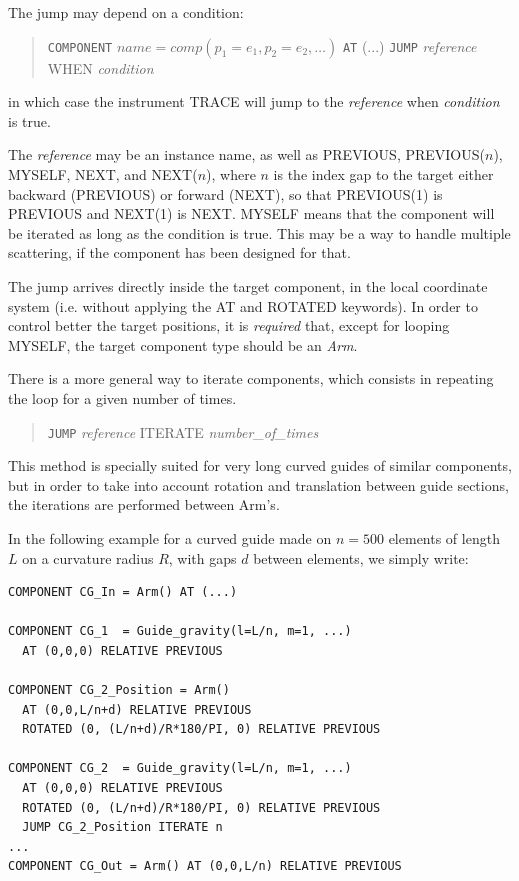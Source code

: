The jump may depend on a condition:
\begin{quote}
  \texttt{COMPONENT} $\textit{name} = \textit{comp}(p_1 = e_1, p_2 = e_2, \ldots)$
  \texttt{AT} (...)
  \texttt{JUMP} {\it reference} WHEN {\it condition}
\end{quote}
in which case the instrument TRACE will jump to the {\it reference} when {\it condition} is true.

The {\it reference} may be an instance name, as well as PREVIOUS, PREVIOUS($n$), MYSELF, NEXT, and NEXT($n$), where $n$ is the index gap to the target either backward (PREVIOUS) or forward (NEXT), so that PREVIOUS(1) is PREVIOUS and NEXT(1) is NEXT. MYSELF means that the component will be iterated as long as the condition is true. This may be a way to handle multiple scattering, if the component has been designed for that.

The jump arrives directly inside the target component, in the local coordinate system (i.e. without applying the AT and ROTATED keywords). In order to control better the target positions, it is \emph{required} that, except for looping MYSELF, the target component type should be an \emph{Arm}.

There is a more general way to iterate components, which consists in repeating the loop for a given number of times.
\begin{quote}
  \texttt{JUMP} {\it reference} ITERATE {\it number\_of\_times}
\end{quote}
This method is specially suited for very long curved guides of similar components, but in order to take into account rotation and translation between guide sections, the iterations are performed between Arm's.

In the following example for a curved guide made on $n=500$ elements of length $L$ on a curvature radius $R$, with gaps $d$ between elements, we simply write:
\begin{verbatim}
COMPONENT CG_In = Arm() AT (...)

COMPONENT CG_1  = Guide_gravity(l=L/n, m=1, ...)
  AT (0,0,0) RELATIVE PREVIOUS

COMPONENT CG_2_Position = Arm()
  AT (0,0,L/n+d) RELATIVE PREVIOUS
  ROTATED (0, (L/n+d)/R*180/PI, 0) RELATIVE PREVIOUS

COMPONENT CG_2  = Guide_gravity(l=L/n, m=1, ...)
  AT (0,0,0) RELATIVE PREVIOUS
  ROTATED (0, (L/n+d)/R*180/PI, 0) RELATIVE PREVIOUS
  JUMP CG_2_Position ITERATE n
...
COMPONENT CG_Out = Arm() AT (0,0,L/n) RELATIVE PREVIOUS
\end{verbatim}

